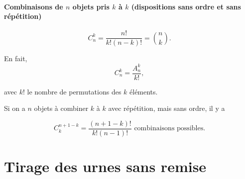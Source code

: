 \documentclass[french]{book}
\theoremstyle{definition}
\theoremstyle{remark}
\newtheorem{exo}{Exercice}
\begin{document}
\paragraph{Combinaisons de $n$ objets pris $k$ à $k$ (dispositions sans ordre et sans répétition)}

\begin{equation}
  C _{n} ^{k} = \frac{n!}{k!(n-k)!} = \binom{n}{k}.
\end{equation}

En fait,
\begin{equation*}
  C _{n} ^{k} = \frac{A _{n} ^{k}}{k!},
\end{equation*}

avec $k!$ le nombre de permutations des $k$ éléments.



Si on a $n$ objets à combiner $k$ à $k$ avec répétition, mais sans ordre, il y a

\begin{equation}
  C _{k} ^{n+1-k} = \frac{(n+1-k)!}{k!(n-1)!} \text{ combinaisons possibles.}
\end{equation}




\section{Tirage des urnes sans remise}
\end{document}
